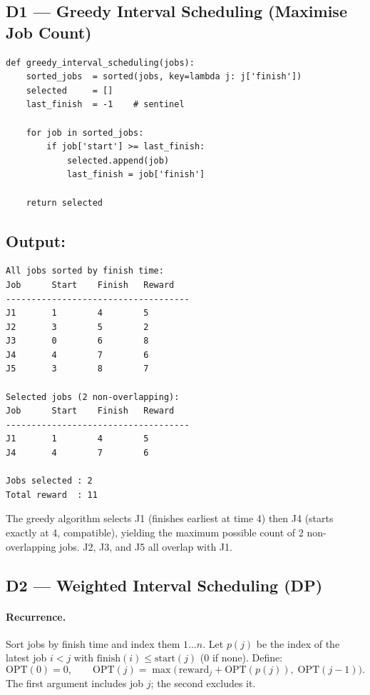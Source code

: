 \documentclass[11pt,a4paper]{article}
\begin{document}
\subsection{D1 --- Greedy Interval Scheduling (Maximise Job Count)}

\begin{lstlisting}[style=python, caption={Greedy earliest-finish-time scheduling (src/d1\_greedy\_scheduling.py).}]
def greedy_interval_scheduling(jobs):
    sorted_jobs  = sorted(jobs, key=lambda j: j['finish'])
    selected     = []
    last_finish  = -1    # sentinel

    for job in sorted_jobs:
        if job['start'] >= last_finish:
            selected.append(job)
            last_finish = job['finish']

    return selected
\end{lstlisting}

\subsection{Output:}
\begin{lstlisting}[style=output]
All jobs sorted by finish time:
Job      Start    Finish   Reward
------------------------------------
J1       1        4        5
J2       3        5        2
J3       0        6        8
J4       4        7        6
J5       3        8        7

Selected jobs (2 non-overlapping):
Job      Start    Finish   Reward
------------------------------------
J1       1        4        5
J4       4        7        6

Jobs selected : 2
Total reward  : 11
\end{lstlisting}

The greedy algorithm selects J1 (finishes earliest at time 4) then J4 (starts exactly at 4, compatible), yielding the maximum possible count of 2 non-overlapping jobs. J2, J3, and J5 all overlap with J1.

\subsection{D2 --- Weighted Interval Scheduling (DP)}

\paragraph{Recurrence.}
Sort jobs by finish time and index them $1 \ldots n$. Let $p(j)$ be the index of the latest job $i < j$ with $\mathrm{finish}(i) \le \mathrm{start}(j)$ (0 if none). Define:
\[
\mathrm{OPT}(0) = 0, \qquad
\mathrm{OPT}(j) = \max\!\bigl(\,\mathrm{reward}_j + \mathrm{OPT}(p(j)),\;\mathrm{OPT}(j-1)\bigr).
\]
The first argument includes job $j$; the second excludes it.
\end{document}
